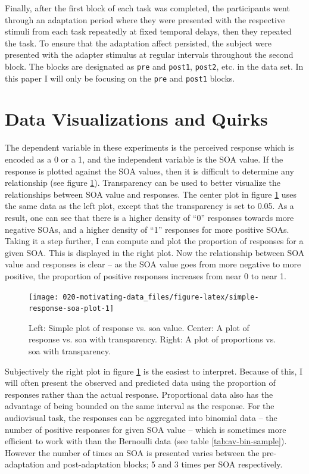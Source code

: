 \documentclass[11pt, oneside, openany]{scrbook}
\begin{document}
Finally, after the first block of each task was completed, the participants went through an adaptation period where they were presented with the respective stimuli from each task repeatedly at fixed temporal delays, then they repeated the task. To ensure that the adaptation affect persisted, the subject were presented with the adapter stimulus at regular intervals throughout the second block. The blocks are designated as \texttt{pre} and \texttt{post1}, \texttt{post2}, etc. in the data set. In this paper I will only be focusing on the \texttt{pre} and \texttt{post1} blocks.

\hypertarget{data-visualizations-and-quirks}{%
\section{Data Visualizations and Quirks}\label{data-visualizations-and-quirks}}

The dependent variable in these experiments is the perceived response which is encoded as a 0 or a 1, and the independent variable is the SOA value. If the response is plotted against the SOA values, then it is difficult to determine any relationship (see figure \ref{fig:simple-response-soa-plot}). Transparency can be used to better visualize the relationships between SOA value and responses. The center plot in figure \ref{fig:simple-response-soa-plot} uses the same data as the left plot, except that the transparency is set to 0.05. As a result, one can see that there is a higher density of ``0'' responses towards more negative SOAs, and a higher density of ``1'' responses for more positive SOAs. Taking it a step further, I can compute and plot the proportion of responses for a given SOA. This is displayed in the right plot. Now the relationship between SOA value and responses is clear -- as the SOA value goes from more negative to more positive, the proportion of positive responses increases from near 0 to near 1.

\begin{figure}

{\centering \texttt{[image: 020-motivating-data\_files/figure-latex/simple-response-soa-plot-1]} 

}

\caption{Left: Simple plot of response vs. soa value. Center: A plot of response vs. soa with transparency. Right: A plot of proportions vs. soa with transparency.}\label{fig:simple-response-soa-plot}
\end{figure}

Subjectively the right plot in figure \ref{fig:simple-response-soa-plot} is the easiest to interpret. Because of this, I will often present the observed and predicted data using the proportion of responses rather than the actual response. Proportional data also has the advantage of being bounded on the same interval as the response. For the audiovisual task, the responses can be aggregated into binomial data -- the number of positive responses for given SOA value -- which is sometimes more efficient to work with than the Bernoulli data (see table \ref{tab:av-bin-sample}). However the number of times an SOA is presented varies between the pre-adaptation and post-adaptation blocks; 5 and 3 times per SOA respectively.
\end{document}
